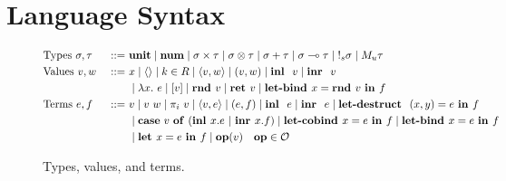 \section{Language Syntax}

\begin{figure}[tbp]
  \begin{alignat*}{3}
         &\text{Types } \sigma, \tau &::=~ &\mathbf{unit}
         \mid \textbf{num}
         \mid \sigma \times \tau 
         \mid \sigma \otimes \tau
         \mid \sigma + \tau 
         \mid \sigma \multimap \tau
         \mid {{!_{s}} \sigma}
         \mid {M_u \tau}
         \\
         &\text{Values } v, w \ &::=~ &x
         \mid \langle \rangle
         \mid k \in R
         \mid \langle v,w \rangle 
         \mid  (v, w)
         \mid \textbf{inl } \ v
         \mid \textbf{inr } \ v
         \\
         & & & \mid \lambda x.~e 
         \mid [v]
         \mid\textbf{rnd } v
         \mid {\textbf{ret }v} 
         \mid \textbf{let-bind } x = \textbf{rnd } v \ \textbf{in } f \\
         &\text{Terms } e, f &::=~ & v
         \mid v~w
         \mid {\pi}_i\ v
         \mid \langle v,e \rangle 
         \mid  (e, f)
         \mid \textbf{inl } \ e
         \mid \textbf{inr } \ e
         \mid \textbf{let-destruct } \ (x,y) = e \ \textbf{in } f \\
         & & & \mid \mathbf{case} \ v \ \mathbf{of} \ (\textbf{inl } x.e \ | \ \textbf{inr } x.f) 
         \mid \textbf{let-cobind } x = e \ \textbf{in }  f
         \mid {\textbf{let-bind }x = e \ \textbf{in }f} \\
         & & & \mid \textbf{let } x  = e \ \textbf{in }  f 
         \mid \mathbf{op}(v) \quad \mathbf{op} \in \mathcal{O}
  \end{alignat*}
  \caption{Types, values, and terms.}
  \label{fig:syntax}
\end{figure}


